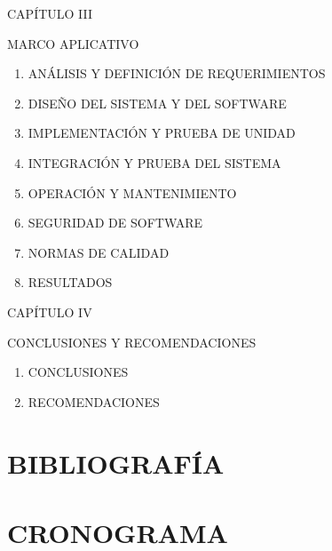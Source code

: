 \documentclass[12pt,letterpaper]{article}
\begin{document}
\noindent CAPÍTULO III

\noindent MARCO APLICATIVO

\begin{enumerate}[nosep, label=3.\arabic*., left = 0pt .. \parindent]
    \item ANÁLISIS Y DEFINICIÓN DE REQUERIMIENTOS
    \item DISEÑO DEL SISTEMA Y DEL SOFTWARE
    \item IMPLEMENTACIÓN Y PRUEBA DE UNIDAD
    \item INTEGRACIÓN Y PRUEBA DEL SISTEMA
    \item OPERACIÓN Y MANTENIMIENTO
    \item SEGURIDAD DE SOFTWARE
    \item NORMAS DE CALIDAD
    \item RESULTADOS
\end{enumerate}

\noindent CAPÍTULO IV

\noindent CONCLUSIONES Y RECOMENDACIONES

\begin{enumerate}[nosep, label=4.\arabic*., left = 0pt .. \parindent]
    \item CONCLUSIONES
    \item RECOMENDACIONES
\end{enumerate}


\section{BIBLIOGRAFÍA}
\nocite{cuevas2023}
\printbibliography[heading=none]
\section{CRONOGRAMA}
\end{document}
